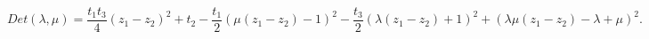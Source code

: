 \begin{equation}\label{det1}
 Det(\lambda,\mu)=\frac {t_1 t_3}{4}(z_1-z_2)^2+t_2 - \frac {t_1}
  2 (\mu (z_1-z_2)-1)^2- \frac {t_3}2(\lambda(z_1-z_2)+1)^2 +(\lambda
  \mu(z_1-z_2)-\lambda+\mu)^2.
\end{equation}

